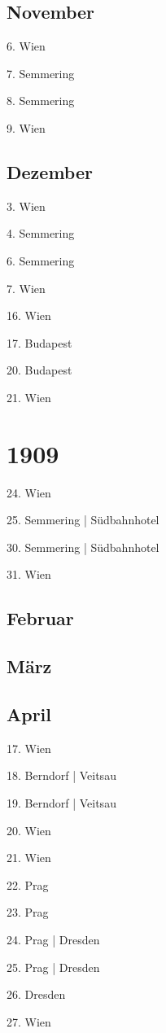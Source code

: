 \documentclass[twoside=false,titlepage=false,open=any, parskip=never, fontsize=10pt, headings=small, chapterprefix=false, appendixprefix=false, DIV=15]{scrbook}
\begin{document}
\begin{multicols}{3}
            \section*{November}
            6. Wien\par
            7. Semmering\par
            8. Semmering\par
            9. Wien\par
            \section*{Dezember}
            3. Wien\par
            4. Semmering\par
            6. Semmering\par
            7. Wien\par
            16. Wien\par
            17. Budapest\par
            20. Budapest\par
            21. Wien\par
            \chapter*{1909}
            24. Wien\par
            25. Semmering | Südbahnhotel\par
            30. Semmering | Südbahnhotel\par
            31. Wien\par
            \section*{Februar}
            \section*{März}
            \section*{April}
            17. Wien\par
            18. Berndorf | Veitsau\par
            19. Berndorf | Veitsau\par
            20. Wien\par
            21. Wien\par
            22. Prag\par
            23. Prag\par
            24. Prag | Dresden\par
            25. Prag | Dresden\par
            26. Dresden\par
            27. Wien\par

\end{multicols}
\end{document}
